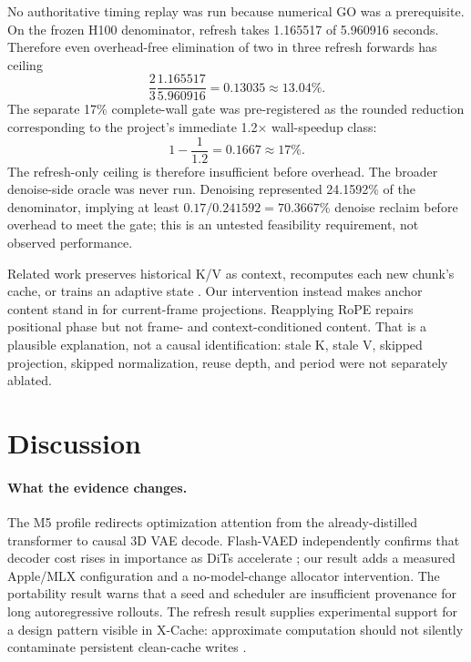 \documentclass[10pt,twocolumn]{article}
\begin{document}
No authoritative timing replay was run because numerical GO was a prerequisite. On the frozen H100 denominator, refresh takes 1.165517 of 5.960916 seconds. Therefore even overhead-free elimination of two in three refresh forwards has ceiling
\begin{equation}
\frac{2}{3}\frac{1.165517}{5.960916}=0.13035\approx13.04\%.
\end{equation}
The separate 17\% complete-wall gate was pre-registered as the rounded reduction corresponding to the project's immediate 1.2$\times$ wall-speedup class:
\begin{equation}
1-\frac{1}{1.2}=0.1667\approx17\%.
\end{equation}
The refresh-only ceiling is therefore insufficient before overhead. The broader denoise-side oracle was never run. Denoising represented 24.1592\% of the denominator, implying at least $0.17/0.241592=70.3667\%$ denoise reclaim before overhead to meet the gate; this is an untested feasibility requirement, not observed performance.

Related work preserves historical K/V as context, recomputes each new chunk's cache, or trains an adaptive state \cite{ca2vdm,xcache,causalrcm}. Our intervention instead makes anchor content stand in for current-frame projections. Reapplying RoPE repairs positional phase but not frame- and context-conditioned content. That is a plausible explanation, not a causal identification: stale K, stale V, skipped projection, skipped normalization, reuse depth, and period were not separately ablated.

\section{Discussion}
\paragraph{What the evidence changes.}
The M5 profile redirects optimization attention from the already-distilled transformer to causal 3D VAE decode. Flash-VAED independently confirms that decoder cost rises in importance as DiTs accelerate \cite{flashvaed}; our result adds a measured Apple/MLX configuration and a no-model-change allocator intervention. The portability result warns that a seed and scheduler are insufficient provenance for long autoregressive rollouts. The refresh result supplies experimental support for a design pattern visible in X-Cache: approximate computation should not silently contaminate persistent clean-cache writes \cite{xcache}.
\end{document}
